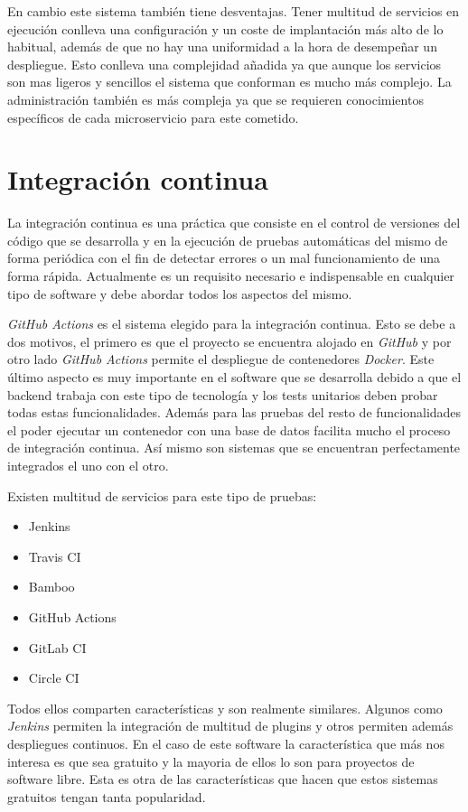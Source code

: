 En cambio este sistema también tiene desventajas. Tener multitud de servicios en ejecución conlleva una configuración y un coste de implantación más alto de lo habitual, además de que no hay una uniformidad a la hora de desempeñar un despliegue. Esto conlleva una complejidad añadida ya que aunque los servicios son mas ligeros y sencillos el sistema que conforman es mucho más complejo. La administración también es más compleja ya que se requieren conocimientos específicos de cada microservicio para este cometido.


\section{Integración continua}

La integración continua es una práctica que consiste en el control de versiones del código que se desarrolla y en la ejecución de pruebas automáticas del mismo de forma periódica con el fin de detectar errores o un mal funcionamiento de una forma rápida. Actualmente es un requisito necesario e indispensable en cualquier tipo de software y debe abordar todos los aspectos del mismo.

\textit{GitHub Actions} es el sistema elegido para la integración continua. Esto se debe a dos motivos, el primero es que el proyecto se encuentra alojado en \textit{GitHub} y por otro lado \textit{GitHub Actions} permite el despliegue de contenedores \textit{Docker}. Este último aspecto es muy importante en el software que se desarrolla debido a que el backend trabaja con este tipo de tecnología y los tests unitarios deben probar todas estas funcionalidades. Además para las pruebas del resto de funcionalidades el poder ejecutar un contenedor con una base de datos facilita mucho el proceso de integración continua. Así mismo son sistemas que se encuentran perfectamente integrados el uno con el otro.

\bigskip
Existen multitud de servicios para este tipo de pruebas:
\begin{itemize}
	\item Jenkins
	\item Travis CI
	\item Bamboo
	\item GitHub Actions
	\item GitLab CI
	\item Circle CI
\end{itemize}

Todos ellos comparten características y son realmente similares. Algunos como \textit{Jenkins} permiten la integración de multitud de plugins y otros permiten además despliegues continuos. En el caso de este software la característica que más nos interesa es que sea gratuito y la mayoria de ellos lo son para proyectos de software libre. Esta es otra de las características que hacen que estos sistemas gratuitos tengan tanta popularidad.




